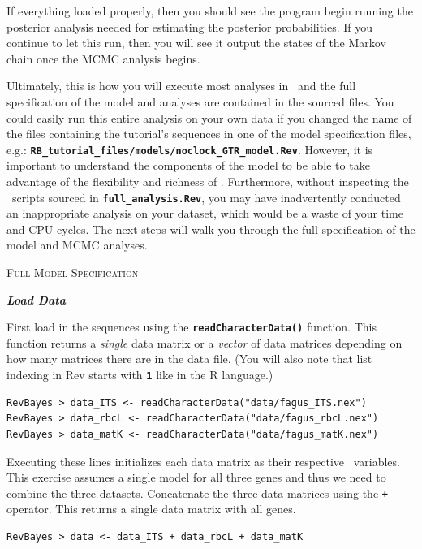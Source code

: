 \documentclass[11pt]{article}
\newcommand{\cl}[1]{{\texttt{\textbf{#1}}}}
\begin{document}
If everything loaded properly, then you should see the program begin running the posterior analysis needed for estimating the posterior probabilities. If you continue to let this run, then you will see it output the states of the Markov chain once the MCMC analysis begins.

Ultimately, this is how you will execute most analyses in \RevBayes~and the full specification of the model and analyses are contained in the sourced files. 
You could easily run this entire analysis on your own data if you changed the name of the files containing the tutorial's sequences in one of the model specification files, e.g.: \cl{RB\_tutorial\_files/models/noclock\_GTR\_model.Rev}. 
However, it is important to understand the components of the model to be able to take advantage of the flexibility and richness of \RevBayes.
Furthermore, without inspecting the \Rev~scripts sourced in \cl{full\_analysis.Rev}, you may have inadvertently conducted an inappropriate analysis on your dataset, which would be a waste of your time and CPU cycles. 
The next steps will walk you through the full specification of the model and MCMC analyses. 

\bigskip
{\large \textcolor{mycol}{\textsc{Full Model Specification}}}

\textbf{\textit{Load Data}}

First load in the sequences using the \cl{readCharacterData()} function. This function returns a \textit{single} data matrix or a \textit{vector} of data matrices depending on how many matrices there are in the data file. (You will also note that list indexing in Rev starts with \cl{1} like in the R language.)
{\tt \begin{snugshade*}
\begin{lstlisting}
RevBayes > data_ITS <- readCharacterData("data/fagus_ITS.nex")
RevBayes > data_rbcL <- readCharacterData("data/fagus_rbcL.nex")
RevBayes > data_matK <- readCharacterData("data/fagus_matK.nex")
\end{lstlisting}
\end{snugshade*}}
Executing these lines initializes each data matrix as their respective \Rev~variables. 
This exercise assumes a single model for all three genes and thus we need to combine the three datasets.
Concatenate the three data matrices using the \cl{+} operator. 
This returns a single data matrix with all genes.

{\tt \begin{snugshade*}
\begin{lstlisting}
RevBayes > data <- data_ITS + data_rbcL + data_matK
\end{lstlisting}
\end{snugshade*}}
\end{document}
